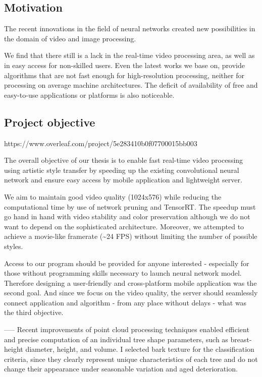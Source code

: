 \documentclass[../Main.tex]{subfiles}
\begin{document}
\subsection{Motivation}
The recent innovations in the field of neural networks created new possibilities in the domain of video and image processing. 

We find that there still is a lack in the real-time video processing area, as well as in easy access for non-skilled users. Even the latest works we base on, provide algorithms that are not fast enough for high-resolution processing, neither for processing on average machine architectures. The deficit of availability of free and easy-to-use applications or platforms is also noticeable.


\subsection{Project objective}https://www.overleaf.com/project/5e283410b0f07700015bb003

The overall objective of our thesis is to enable fast real-time video processing using artistic style transfer by speeding up the existing convolutional neural network and ensure easy access by mobile application and lightweight server.

We aim to maintain good video quality (1024x576) while reducing the computational time by use of network pruning and TensorRT. The speedup must go hand in hand with video stability and color preservation although we do not want to depend on the sophisticated architecture. Moreover, we attempted to achieve a movie-like framerate (\textasciitilde{}24 FPS) without limiting the number of possible styles.

Access to our program should be provided for anyone interested - especially for those without programming skills necessary to launch neural network model. Therefore designing a user-friendly and cross-platform mobile application was the second goal. And since we focus on the video quality, the server should seamlessly connect application and algorithm - from any place without delays - what was the third objective.

-----
        Recent improvements of point cloud processing techniques enabled efficient and precise computation of an individual tree shape parameters, such as breast-height diameter, height, and volume. 
         I selected bark texture for the classification criteria, since they clearly represent unique characteristics of each tree and do not change their appearance under seasonable variation and aged deterioration. 
         
\end{document}
